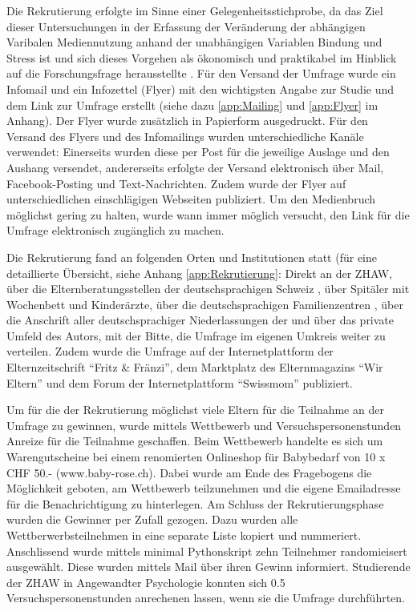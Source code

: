 Die Rekrutierung erfolgte im Sinne einer Gelegenheitsstichprobe, da das Ziel dieser Untersuchungen in der Erfassung der Veränderung der abhängigen Varibalen Mediennutzung anhand der unabhängigen Variablen Bindung und Stress ist und sich dieses Vorgehen als ökonomisch und praktikabel im Hinblick auf die Forschungsfrage herausstellte \cite{TUDresden2015}. Für den Versand der Umfrage wurde ein Infomail und ein Infozettel (Flyer) mit den wichtigsten Angabe zur Studie und dem Link zur Umfrage erstellt (siehe dazu \ref{app:Mailing} und \ref{app:Flyer} im Anhang). Der Flyer wurde zusätzlich in Papierform ausgedruckt. Für den Versand des Flyers und des Infomailings wurden unterschiedliche Kanäle verwendet: Einerseits wurden diese per Post für die jeweilige Auslage und den Aushang versendet, andererseits erfolgte der Versand elektronisch über Mail, Facebook-Posting und Text-Nachrichten. Zudem wurde der Flyer auf unterschiedlichen einschlägigen Webseiten publiziert. Um den Medienbruch möglichst gering zu halten, wurde wann immer möglich versucht, den Link für die Umfrage elektronisch zugänglich zu machen. 

Die Rekrutierung fand an folgenden Orten und Institutionen statt (für eine detaillierte Übersicht, siehe Anhang \ref{app:Rekrutierung}: Direkt an der ZHAW, über die Elternberatungsstellen der deutschsprachigen Schweiz \cite{Sfmvb2018}, über Spitäler mit Wochenbett und Kinderärzte, über die deutschsprachigen Familienzentren \cite{NetzwerkBildung2018}, über die Anschrift aller deutschsprachiger Niederlassungen der  und über das private Umfeld des Autors, mit der Bitte, die Umfrage im eigenen Umkreis weiter zu verteilen. Zudem wurde die Umfrage auf der Internetplattform der Elternzeitschrift \enquote{Fritz \&  Fränzi}, dem Marktplatz des Elternmagazins \enquote{Wir Eltern} und dem Forum der Internetplattform \enquote{Swissmom} publiziert.

Um für die der Rekrutierung möglichst viele Eltern für die Teilnahme an der Umfrage zu gewinnen, wurde mittels Wettbewerb und Versuchspersonenstunden Anreize für die Teilnahme geschaffen. Beim Wettbewerb handelte es sich um Warengutscheine bei einem renomierten Onlineshop für Babybedarf von 10 x CHF 50.- (www.baby-rose.ch). Dabei wurde am Ende des Fragebogens die Möglichkeit geboten, am Wettbewerb teilzunehmen und die eigene Emailadresse für die Benachrichtigung zu hinterlegen. Am Schluss der Rekrutierungsphase wurden die Gewinner per Zufall gezogen. Dazu wurden alle Wettberwerbsteilnehmen in eine separate Liste kopiert und nummeriert. Anschlissend wurde mittels minimal Pythonskript zehn Teilnehmer randomieisert ausgewählt. Diese wurden mittels Mail über ihren Gewinn informiert. Studierende der ZHAW in Angewandter Psychologie konnten sich 0.5 Versuchspersonenstunden anrechenen lassen, wenn sie die Umfrage durchführten. 

